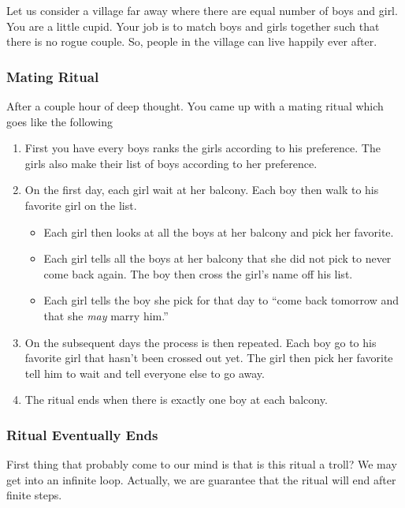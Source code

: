 \documentclass[a4paper, 12pt]{article}
\begin{document}
		Let us consider a village far away where there are equal number of boys and girl. You are a little cupid. Your job is to match boys and girls together such that there is no rogue couple. So, people in the village can live happily ever after.
		
	\subsubsection*{Mating Ritual}
		After a couple hour of deep thought. You came up with a mating ritual which goes like the following
		\begin{enumerate}
			\item First you have every boys ranks the girls according to his preference. The girls also make their list of boys according to her preference.
			
			\item On the first day, each girl wait at her balcony. Each boy then walk to his favorite girl on the list.
			\begin{itemize}
				\item Each girl then looks at all the boys at her balcony and pick her favorite.
				\item Each girl tells all the boys at her balcony that she did not pick to never come back again. The boy then cross the girl's name off his list.
				\item Each girl tells the boy she pick for that day to ``come back tomorrow and that she \emph{may} marry him.''
			\end{itemize}
			
			\item On the subsequent days the process is then repeated. Each boy go to his favorite girl that hasn't been crossed out yet. The girl then pick her favorite tell him to wait and tell everyone else to go away.
			
			\item The ritual ends when there is exactly one boy at each balcony.
		\end{enumerate}
		 
	\subsubsection*{Ritual Eventually Ends}
		
		First thing that probably come to our mind is that is this ritual a troll? We may get into an infinite loop. Actually, we are guarantee that the ritual will end after finite steps.
		
\end{document}
